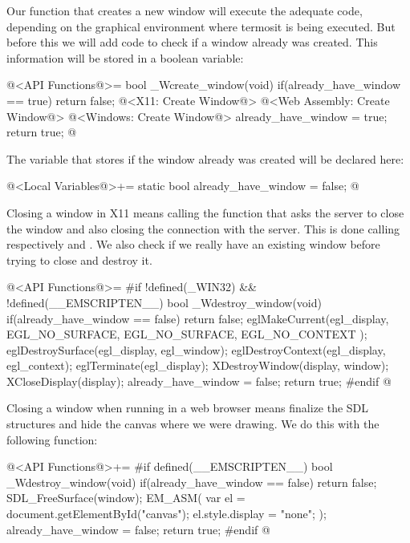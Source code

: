 
Our function that creates a new window will execute the adequate code,
depending on the graphical environment where termosit is being
executed. But before this we will add code to check if a window
already was created. This information will be stored in a boolean
variable:

\iniciocodigo
@<API Functions@>=
bool _Wcreate_window(void){
  if(already_have_window == true)
    return false;
  @<X11: Create Window@>
  @<Web Assembly: Create Window@>
  @<Windows: Create Window@>
  already_have_window = true;
  return true;
}
@
\fimcodigo

The variable that stores if the window already was created will be
declared here:

\iniciocodigo
@<Local Variables@>+=
static bool already_have_window = false;
@
\fimcodigo



Closing a window in X11 means calling the function that asks the
server to close the window and also closing the connection with the
server. This is done calling respectively 
and . We also check if we really have an
existing window before trying to close and destroy it.

\iniciocodigo
@<API Functions@>=
#if !defined(_WIN32) && !defined(__EMSCRIPTEN__)
bool _Wdestroy_window(void){
  if(already_have_window == false)
    return false;
  eglMakeCurrent(egl_display, EGL_NO_SURFACE, EGL_NO_SURFACE,
                 EGL_NO_CONTEXT );
  eglDestroySurface(egl_display, egl_window);
  eglDestroyContext(egl_display, egl_context);
  eglTerminate(egl_display);
  XDestroyWindow(display, window);
  XCloseDisplay(display);
  already_have_window = false;
  return true;
}
#endif
@
\fimcodigo


Closing a window when running in a web browser means finalize the SDL
structures and hide the canvas where we were drawing. We do this with
the following function:

\iniciocodigo
@<API Functions@>+=
#if defined(__EMSCRIPTEN__)
bool _Wdestroy_window(void){
  if(already_have_window == false)
    return false;
  SDL_FreeSurface(window);
  EM_ASM(
    var el = document.getElementById("canvas");
    el.style.display = "none";
  );
  already_have_window = false;
  return true;
}
#endif
@
\fimcodigo

